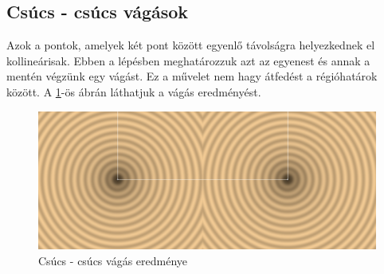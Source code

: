 \subsection{Csúcs - csúcs vágások}

Azok a pontok, amelyek két pont között egyenlő távolságra helyezkednek el kollineárisak. Ebben a lépésben meghatározzuk azt az egyenest és annak a mentén végzünk egy vágást. Ez a művelet nem hagy átfedést a régióhatárok között. A \ref{fig:vertex_vertex_cut-1}-ös ábrán láthatjuk a vágás eredményést.

\begin{figure}[H]
    \centering
    \includegraphics[width=1\linewidth]{images/vertex_vertex_cut.png}
    \caption{Csúcs - csúcs vágás eredménye}
    \label{fig:vertex_vertex_cut-1}
\end{figure}


